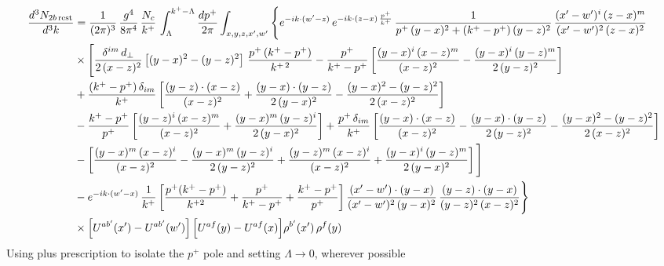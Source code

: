 \documentclass[9pt]{article}
\numberwithin{equation}{section}
\begin{document}
\begin{align}
\frac{d^{3}N_{2b\,\rm rest}}{d^{3}k}&=\frac{1}{(2\pi)^{3}}\,\frac{g^{4}}{8\pi^{4}}\,\frac{N_{c}}{k^{+}}\,\int_{\Lambda}^{k^{+}-\Lambda}\frac{dp^{+}}{2\pi}\int_{x,y,z,x',w'}\Bigg\{e^{-ik\cdot(w'-z)}\,e^{-ik\cdot(z-x)\,\frac{p^{+}}{k^{+}}}\,\frac{1}{p^{+}\,(y-x)^{2}+(k^{+}-p^{+})\,(y-z)^{2}}\,\frac{(x'-w')^{i}\,(z-x)^{m}}{(x'-w')^{2}\,(z-x)^{2}}\notag\\
&\times\Bigg[\frac{\delta^{im}\,d_{\perp}}{2\,(x-z)^{2}}\left[(y-x)^{2}-(y-z)^{2}\right]\,\frac{p^{+}\,(k^{+}-p^{+})}{k^{+\,2}}-\frac{p^{+}}{k^{+}-p^{+}}\left[\frac{(y-x)^{i}\,(x-z)^{m}}{(x-z)^{2}}-\frac{(y-x)^{i}\,(y-z)^{m}}{2\,(y-z)^{2}}\right]\notag\\
&+\frac{(k^{+}-p^{+})\,\delta_{im}}{k^{+}}\left[\frac{(y-z)\cdot(x-z)}{(x-z)^{2}}+\frac{(y-x)\cdot(y-z)}{2\,(y-x)^{2}}-\frac{(y-x)^{2}-(y-z)^{2}}{2\,(x-z)^{2}}\right]
\notag \\ & -\frac{k^{+}-p^{+}}{p^{+}}\left[\frac{(y-z)^{i}\,(x-z)^{m}}{(x-z)^{2}}+\frac{(y-x)^{m}\,(y-z)^{i}}{2\,(y-x)^{2}}\right]+\frac{p^{+}\,\delta_{im}}{k^{+}}\left[\frac{(y-x)\cdot(x-z)}{(x-z)^{2}}-\frac{(y-x)\cdot(y-z)}{2\,(y-z)^{2}}-\frac{(y-x)^{2}-(y-z)^{2}}{2\,(x-z)^{2}}\right]\notag\\
&-\left[\frac{(y-x)^{m}\,(x-z)^{i}}{(x-z)^{2}}-\frac{(y-x)^{m}\,(y-z)^{i}}{2\,(y-z)^{2}}+\frac{(y-z)^{m}\,(x-z)^{i}}{(x-z)^{2}}+\frac{(y-x)^{i}\,(y-z)^{m}}{2\,(y-x)^{2}}\right]\Bigg]\notag\\
&-e^{-ik\cdot(w'-x)}\,\frac{1}{k^{+}}\left[\frac{p^{+}(k^{+}-p^{+})}{k^{+2}}+\frac{p^{+}}{k^{+}-p^{+}}+\frac{k^{+}-p^{+}}{p^{+}}\right]\frac{(x'-w')\cdot(y-x)}{(x'-w')^{2}\,(y-x)^{2}}\,\frac{(y-z)\cdot(y-x)}{(y-z)^{2}\,(x-z)^{2}}\Bigg\}\notag\\
&\times\Big[U^{ab'}(x')-U^{ab'}(w')\Big]\,\Big[U^{af}(y)-U^{af}(x)\Big]\rho^{b'}(x')\,\rho^{f}(y)
\end{align}
Using plus prescription to isolate the $p^{+}$ pole and setting $\Lambda\to 0$, wherever possible
\end{document}
